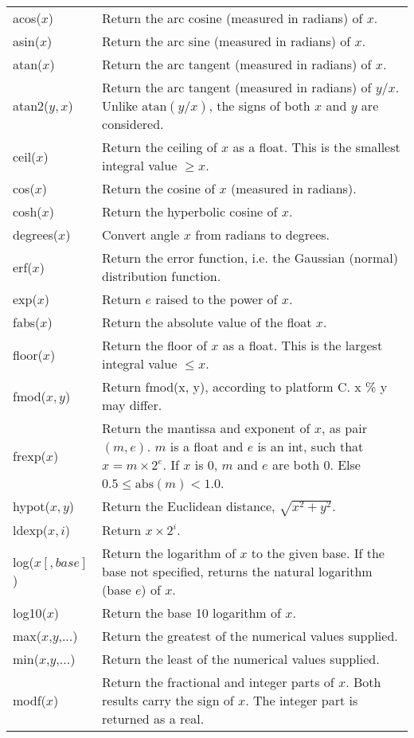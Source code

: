 \begin{table}
\begin{longtable}{|lp{8cm}|}
\hline
acos($x$)&
Return the arc cosine (measured in radians) of $x$.\\
asin($x$)&
Return the arc sine (measured in radians) of $x$.\\
atan($x$)&
Return the arc tangent (measured in radians) of $x$.\\
atan2($y,x$)&
Return the arc tangent (measured in radians) of $y/x$. Unlike $\mathrm{atan}(y/x)$, the signs of both $x$ and $y$ are considered.\\
ceil($x$)&
Return the ceiling of $x$ as a float. This is the smallest integral value $\geq x$.\\
cos($x$)&
Return the cosine of $x$ (measured in radians).\\
cosh($x$)&
Return the hyperbolic cosine of $x$.\\
degrees($x$)&
Convert angle $x$ from radians to degrees.\\
erf($x$)&
Return the error function, i.e. the Gaussian (normal) distribution function.\\
exp($x$)&
Return $e$ raised to the power of $x$.\\
fabs($x$)&
Return the absolute value of the float $x$.\\
floor($x$)&
Return the floor of $x$ as a float. This is the largest integral value $\leq x$.\\
fmod($x,y$)&
Return fmod(x, y), according to platform C.  x \% y may differ.\\
frexp($x$)&
Return the mantissa and exponent of $x$, as pair $(m,e)$. $m$ is a float and $e$ is an int, such that $x = m \times 2^e$. If $x$ is 0, $m$ and $e$ are both 0.  Else $0.5 \leq \mathrm{abs}(m) < 1.0$.\\
hypot($x,y$)&
Return the Euclidean distance, $\sqrt{x^2 + y^2}$.\\
ldexp($x, i$)&
Return $x \times 2^i$. \\
log($x[,base]$)&
Return the logarithm of $x$ to the given base. If the base not specified, returns the natural logarithm (base $e$) of $x$.\\
log10($x$)&
Return the base 10 logarithm of $x$.\\
max($x$,$y$,...)&
Return the greatest of the numerical values supplied.\\
min($x$,$y$,...)&
Return the least of the numerical values supplied.\\
modf($x$)&
Return the fractional and integer parts of $x$.  Both results carry the sign of $x$.  The integer part is returned as a real.\\

\end{longtable}
\end{table}
